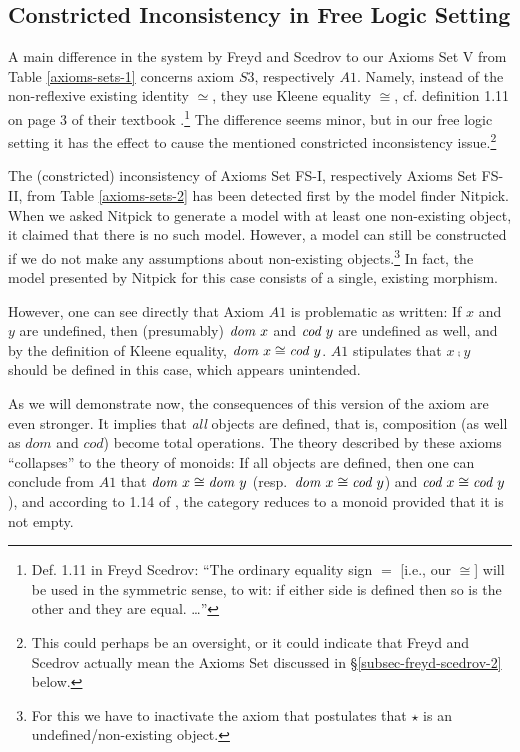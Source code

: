  \subsection{Constricted Inconsistency in Free Logic
   Setting} \label{subsec-freyd-scedrov-1} A main difference in the
 system by Freyd and Scedrov to our Axioms Set V from Table
 \ref{axioms-sets-1} concerns axiom $S3$, respectively $A1$. Namely,
 instead of the non-reflexive existing identity $\simeq$, they use
 Kleene equality $\cong$, cf. definition 1.11 on page 3 of their textbook
 \cite{FreydScedrov90}.\footnote{Def. 1.11 in Freyd Scedrov: ``The
   ordinary equality sign $=$ [i.e., our $\cong$] will be used in the
   symmetric sense, to wit: if either side is defined then so is the
   other and they are equal. \ldots''} The difference seems minor, but
 in our free logic setting it has the effect to cause the mentioned
 constricted inconsistency issue.\footnote{This could perhaps be an
   oversight, or it could indicate that Freyd and Scedrov actually
   mean the Axioms Set discussed in \S\ref{subsec-freyd-scedrov-2}
   below.%
 }

  The (constricted) inconsistency of Axioms Set FS-I, respectively
  Axioms Set FS-II, from Table \ref{axioms-sets-2} has been 
  detected first by the model finder Nitpick. When we asked Nitpick to
  generate a model with at least one non-existing object, it claimed
  that there is no such model. However, a model can still be
  constructed if we do not make any assumptions about non-existing
  objects.\footnote{For this we have to inactivate the axiom
    that postulates that $\star$ is an undefined/non-existing object.} In fact, the model presented by Nitpick for this case
  consists of a single, existing morphism.

However, one can see directly that Axiom $A1$ is problematic
as written: If $x$ and $y$ are undefined, then
(presumably) $\textit{dom \/} x$ and $\textit{cod \/} y$ are undefined as
well, and by the definition of Kleene equality, $\textit{dom \/} x \cong \textit{cod \/}
  y$. $A1$ stipulates that $x \comp y$ should be defined in
this case, which appears unintended.

As we will demonstrate now, the consequences of this version of the axiom are
even stronger. It implies that \emph{all} objects are defined,
that is, composition (as well as $dom$ and $cod$) become total operations.
The theory described by these axioms ``collapses'' to the theory of
monoids: If all objects are defined, then one can conclude from $A1$ that 
$\textit{dom \/} x \cong \textit{dom \/} y$ (resp.~$\textit{dom \/} x \cong \textit{cod \/} y$) and $\textit{cod \/} x \cong \textit{cod \/} y$), 
and according to 1.14 of \cite{FreydScedrov90}, 
the category reduces to a monoid provided that it is not empty.

